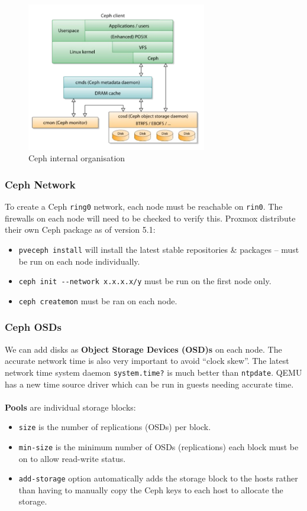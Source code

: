 \documentclass[a4paper,11pt]{article}
\begin{document}
\begin{figure}[H]
    \centering
    \includegraphics[width=0.7\textwidth]{./images/cephinternal.png}
    \caption{ Ceph internal organisation }
\end{figure}

\subsubsection{Ceph Network}
To create a Ceph \verb|ring0| network, each node must be reachable on \verb|rin0|.
The firewalls on each node will need to be checked to verify this.
Proxmox distribute their own Ceph package as of version 5.1:
\begin{itemize}
    \item   \verb|pveceph install| will install the latest stable repositories \& packages -- must be run on each node individually.
    \item   \verb|ceph init --network x.x.x.x/y| must be run on the first node only.
    \item   \verb|ceph createmon| must be ran on each node.
\end{itemize}

\subsubsection{Ceph OSDs}
We can add disks as \textbf{Object Storage Devices (OSD)s} on each node.
The accurate network time is also very important to avoid ``clock skew''.
The latest network time system daemon \verb|system.time?| is much better than \verb|ntpdate|.
QEMU has a new time source driver which can be run in guests needing accurate time.
\\\\
\textbf{Pools} are individual storage blocks:
\begin{itemize}
    \item   \verb|size| is the number of replications (OSDs) per block.
    \item   \verb|min-size| is the minimum number of OSDs (replications) each block must be on to allow read-write status.
    \item   \verb|add-storage| option automatically adds the storage block to the hosts rather than having to manually copy the Ceph keys to each host to allocate the storage.
\end{itemize}
\end{document}

